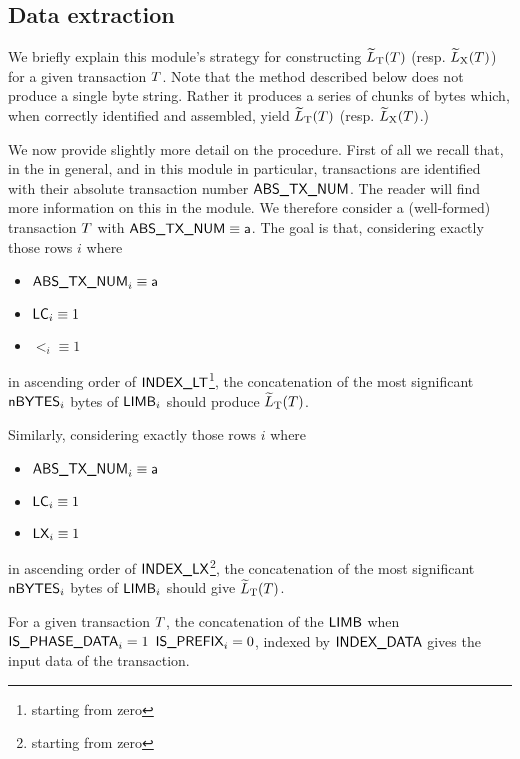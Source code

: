 \subsection{Data extraction}

We briefly explain this module's strategy for constructing $\widetilde{L}_{\mathrm{T}}(T)$ (resp. $\widetilde{L}_{\mathrm{X}}(T)$) for a given transaction $T$.
Note that the method described below does not produce a single byte string.
Rather it produces a series of chunks of bytes which, when correctly identified and assembled, yield $\widetilde{L}_{\mathrm{T}}(T)$ (resp. $\widetilde{L}_{\mathrm{X}}(T)$.)

We now provide slightly more detail on the procedure.
First of all we recall that, in the \zkEvm{} in general, and in this module in particular, transactions are identified with their absolute transaction number $\textsf{ABS\_TX\_NUM}$.
The reader will find more information on this in the \txnDataMod{} module.
We therefore consider a (well-formed) transaction $T$ with $\textsf{ABS\_TX\_NUM} \equiv \textsf{a}$.
The goal is that, considering exactly those rows $i$ where
\begin{multicols}{3}
	\begin{itemize}
		\item $\textsf{ABS\_TX\_NUM}_{i} \equiv \textsf{a}$
		\item $\textsf{LC}_{i} \equiv 1$
		\item $\lt_{i} \equiv 1$
	\end{itemize}
\end{multicols}
\noindent in ascending order of $\textsf{INDEX\_LT}$\footnote{starting from zero},
the concatenation of the most significant 
$\textsf{nBYTES} _{i}$ bytes of $\textsf{LIMB} _{i}$ should produce $\widetilde{L}_{\mathrm{T}}(T)$.

Similarly, considering exactly those rows $i$ where
\begin{multicols}{3}
	\begin{itemize}
		\item $\textsf{ABS\_TX\_NUM}_{i} \equiv \textsf{a}$
		\item $\textsf{LC}_{i} \equiv 1$
		\item $\textsf{LX}_{i} \equiv 1$
	\end{itemize}
\end{multicols}
\noindent in ascending order of $\textsf{INDEX\_LX}$\footnote{starting from zero},
the concatenation of the most significant 
$\textsf{nBYTES} _{i}$ bytes of $\textsf{LIMB} _{i}$ should give $\widetilde{L}_{\mathrm{T}}(T)$.

\saNote{} For a given transaction $T$,
the concatenation of the
$\textsf{LIMB}$ when
$\textsf{IS\_PHASE\_DATA}_{i}=1$ \et{}
$\textsf{IS\_PREFIX}_{i}=0$, indexed by
$\textsf{INDEX\_DATA}$ gives the input data of the transaction.
